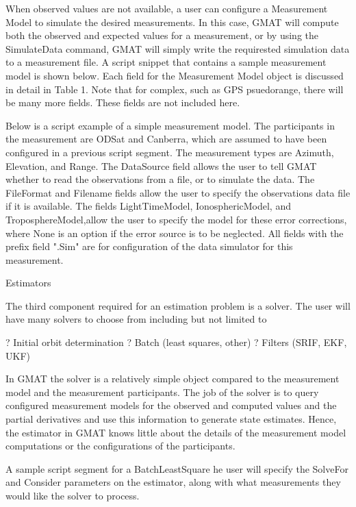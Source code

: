 When observed values are not available, a user can configure a
Measurement Model to simulate the desired measurements.  In this
case, GMAT will compute both the observed and expected values for a
measurement, or by using the SimulateData command, GMAT will simply
write the requirested simulation data to a measurement file.    A
script snippet that contains a sample measurement model is shown
below.  Each field for the Measurement Model object is discussed in
detail in Table 1.  Note that for complex, such as GPS psuedorange,
there will be many more fields.  These fields are not included here.

Below is a script example of a simple measurement model.  The
participants in the measurement are ODSat and Canberra, which are
assumed to have been configured in a previous script segment.   The
measurement types are Azimuth, Elevation, and Range.  The DataSource
field allows the user to tell GMAT whether to read the observations
from a file, or to simulate the data. The FileFormat and Filename
fields allow the user to specify the observations data file if it is
available.    The fields  LightTimeModel, IonosphericModel, and
TroposphereModel,allow the user to specify the model for these error
corrections, where None is an option if the error source is to be
neglected.   All fields with the prefix field ".Sim" are for
configuration of the data simulator for this measurement.





Estimators

The third component required for an estimation problem is a solver.
The user will have many solvers to choose from including but not
limited to

?   Initial orbit determination ?   Batch (least squares, other) ?
Filters (SRIF, EKF, UKF)

In GMAT the solver is a relatively simple object compared to the
measurement model and the measurement  participants.  The job of the
solver is to query configured measurement models for the observed
and computed values  and the partial derivatives  and use this
information  to generate state estimates.  Hence,  the estimator in
GMAT knows little about the details of the measurement model
computations or the configurations of the participants.

A sample script segment for a BatchLeastSquare he user will specify
the SolveFor and Consider parameters on the estimator, along with
what measurements they would like the solver to process.

